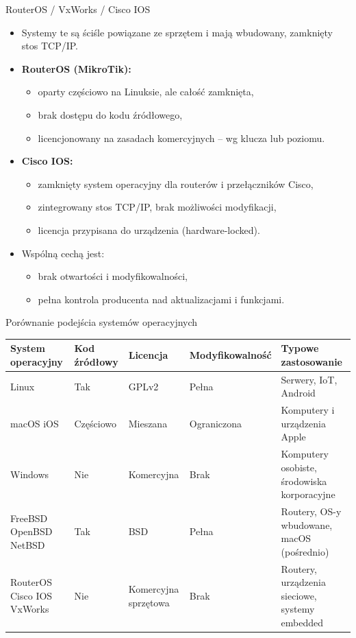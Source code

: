 \documentclass[aspectratio=169]{beamer}
\begin{document}
\begin{frame}{RouterOS / VxWorks / Cisco IOS}
  \begin{itemize}
    \item Systemy te są ściśle powiązane ze sprzętem i mają wbudowany, zamknięty stos TCP/IP.
    \item \textbf{RouterOS (MikroTik):}
    \begin{itemize}
      \item oparty częściowo na Linuksie, ale całość zamknięta,
      \item brak dostępu do kodu źródłowego,
      \item licencjonowany na zasadach komercyjnych – wg klucza lub poziomu.
    \end{itemize}
    \item \textbf{Cisco IOS:}
    \begin{itemize}
      \item zamknięty system operacyjny dla routerów i przełączników Cisco,
      \item zintegrowany stos TCP/IP, brak możliwości modyfikacji,
      \item licencja przypisana do urządzenia (hardware-locked).
    \end{itemize}
    \item Wspólną cechą jest:
    \begin{itemize}
      \item brak otwartości i modyfikowalności,
      \item pełna kontrola producenta nad aktualizacjami i funkcjami.
    \end{itemize}
  \end{itemize}
\end{frame}

\begin{frame}{Porównanie podejścia systemów operacyjnych}
\scriptsize
\begin{tabular}{|p{2.5cm}|p{2cm}|p{2.3cm}|p{2.2cm}|p{4.0cm}|}
  \hline
  \textbf{System operacyjny} & \textbf{Kod źródłowy} & \textbf{Licencja} & \textbf{Modyfikowalność} & \textbf{Typowe zastosowanie} \\
  \hline
  Linux & Tak & GPLv2 & Pełna & Serwery, IoT, Android \\
  \hline
  macOS iOS & Częściowo & Mieszana & Ograniczona & Komputery i urządzenia Apple \\
  \hline
  Windows & Nie & Komercyjna & Brak & Komputery osobiste, środowiska korporacyjne \\
  \hline
  FreeBSD OpenBSD NetBSD & Tak & BSD & Pełna & Routery, OS-y wbudowane, \mbox{macOS} (pośrednio) \\
  \hline
  RouterOS Cisco IOS VxWorks & Nie & Komercyjna sprzętowa & Brak & Routery, urządzenia sieciowe, systemy embedded \\
  \hline
\end{tabular}
\end{frame}
\end{document}
